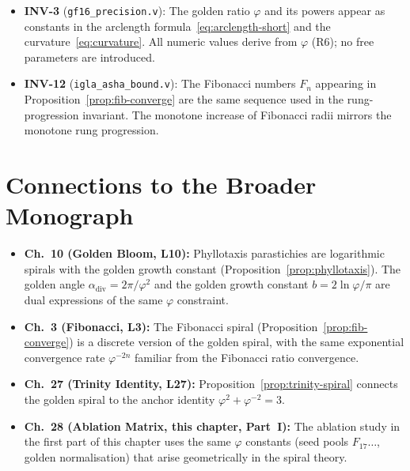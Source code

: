 \begin{itemize}
  \item \textbf{INV-3} (\texttt{gf16\_precision.v}): The golden
    ratio \(\varphi\) and its powers appear as constants in the
    arclength formula~\eqref{eq:arclength-short} and the
    curvature~\eqref{eq:curvature}.  All numeric values derive
    from \(\varphi\) (R6); no free parameters are introduced.

  \item \textbf{INV-12} (\texttt{igla\_asha\_bound.v}): The
    Fibonacci numbers \(F_n\) appearing in
    Proposition~\ref{prop:fib-converge} are the same sequence
    used in the rung-progression invariant.  The monotone
    increase of Fibonacci radii mirrors the monotone rung
    progression.
\end{itemize}

\section{Connections to the Broader Monograph}
\label{sec:17-connections}

\begin{itemize}
  \item \textbf{Ch.~10 (Golden Bloom, L10):} Phyllotaxis
    parastichies are logarithmic spirals with the golden growth
    constant (Proposition~\ref{prop:phyllotaxis}).  The golden
    angle \(\alpha_\text{div} = 2\pi/\varphi^2\) and the golden
    growth constant \(b = 2\ln\varphi/\pi\) are dual expressions
    of the same \(\varphi\) constraint.

  \item \textbf{Ch.~3 (Fibonacci, L3):} The Fibonacci spiral
    (Proposition~\ref{prop:fib-converge}) is a discrete version
    of the golden spiral, with the same exponential convergence
    rate \(\varphi^{-2n}\) familiar from the Fibonacci ratio
    convergence.

  \item \textbf{Ch.~27 (Trinity Identity, L27):}
    Proposition~\ref{prop:trinity-spiral} connects the golden
    spiral to the anchor identity \(\varphi^2+\varphi^{-2}=3\).

  \item \textbf{Ch.~28 (Ablation Matrix, this chapter, Part~I):}
    The ablation study in the first part of this chapter uses
    the same \(\varphi\) constants (seed pools \(F_{17}\ldots\),
    golden normalisation) that arise geometrically in the spiral
    theory.
\end{itemize}

